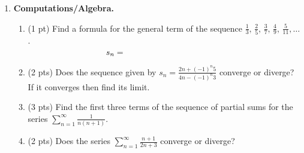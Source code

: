 \documentclass[11pt,letterpaper]{article}
\begin{document}
\begin{enumerate}
\begin{enumerate}
\vspace{8pc}
\end{enumerate}

\vspace{1pc}

\item \textbf{Computations/Algebra.} 
 
\begin{enumerate}
\item (1 pt) Find a formula for the general term of the sequence $\frac{1}{3},\,\frac{2}{5},\,\frac{3}{7},\,\frac{4}{9},\,\frac{5}{11},\dots$.
\[s_n=\hspace{10pc}\]

\item (2 pts) Does the sequence given by $s_n=\frac{2n+(-1)^n5}{4n-(-1)^n3}$ converge or diverge?  If it converges then find its limit.

\vspace{5pc}
\item (3 pts) Find the first three terms of the sequence of partial sums for the series $\sum_{n=1}^{\infty}\frac{1}{n(n+1)}$.

\vspace{8pc}
\item (2 pts) Does the series $\sum_{n=1}^{\infty}\frac{n+1}{2n+3}$ converge or diverge?

\end{enumerate}

\end{enumerate}
\end{document}
